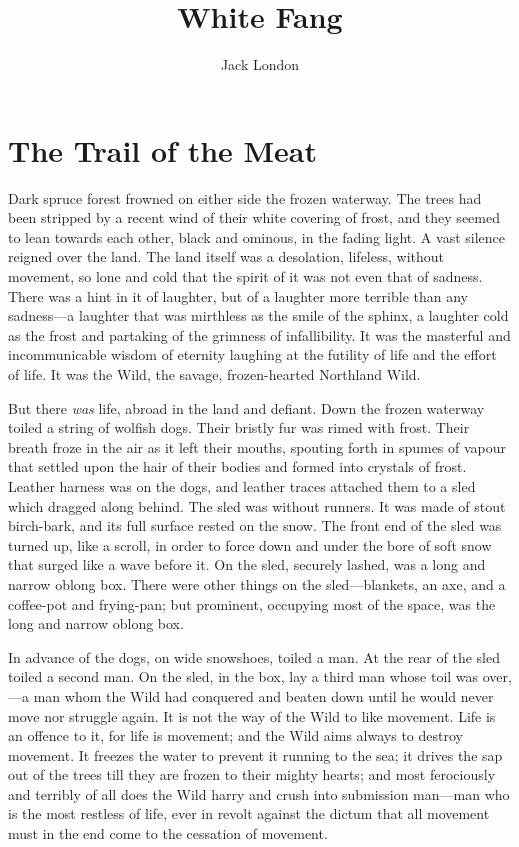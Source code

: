 \documentclass[10pt]{book}
\title{White Fang}
\author{Jack London}
\date{}
\begin{document}
\frontmatter
\tableofcontents
\newpage

\mainmatter

\chapter{The Trail of the Meat}

Dark spruce forest frowned on either side the frozen waterway. The
trees had been stripped by a recent wind of their white covering of
frost, and they seemed to lean towards each other, black and ominous,
in the fading light. A vast silence reigned over the land. The land
itself was a desolation, lifeless, without movement, so lone and cold
that the spirit of it was not even that of sadness. There was a hint in
it of laughter, but of a laughter more terrible than any sadness—a
laughter that was mirthless as the smile of the sphinx, a laughter cold
as the frost and partaking of the grimness of infallibility. It was the
masterful and incommunicable wisdom of eternity laughing at the
futility of life and the effort of life. It was the Wild, the savage,
frozen-hearted Northland Wild.

But there \emph{was} life, abroad in the land and defiant. Down the frozen
waterway toiled a string of wolfish dogs. Their bristly fur was rimed
with frost. Their breath froze in the air as it left their mouths,
spouting forth in spumes of vapour that settled upon the hair of their
bodies and formed into crystals of frost. Leather harness was on the
dogs, and leather traces attached them to a sled which dragged along
behind. The sled was without runners. It was made of stout birch-bark,
and its full surface rested on the snow. The front end of the sled was
turned up, like a scroll, in order to force down and under the bore of
soft snow that surged like a wave before it. On the sled, securely
lashed, was a long and narrow oblong box. There were other things on
the sled—blankets, an axe, and a coffee-pot and frying-pan; but
prominent, occupying most of the space, was the long and narrow oblong
box.

In advance of the dogs, on wide snowshoes, toiled a man. At the rear of
the sled toiled a second man. On the sled, in the box, lay a third man
whose toil was over,—a man whom the Wild had conquered and beaten down
until he would never move nor struggle again. It is not the way of the
Wild to like movement. Life is an offence to it, for life is movement;
and the Wild aims always to destroy movement. It freezes the water to
prevent it running to the sea; it drives the sap out of the trees till
they are frozen to their mighty hearts; and most ferociously and
terribly of all does the Wild harry and crush into submission man—man
who is the most restless of life, ever in revolt against the dictum
that all movement must in the end come to the cessation of movement.
\end{document}
